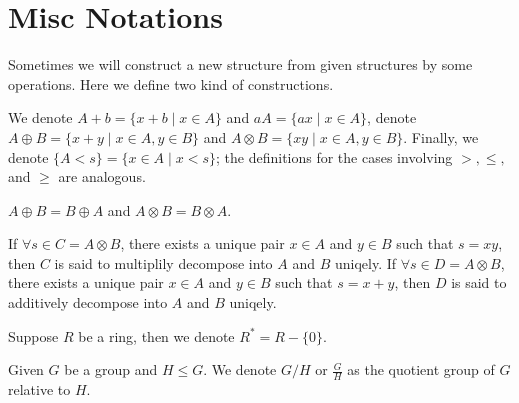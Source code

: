 \section{Misc Notations}\label{sec:misc-notations}
Sometimes we will construct a new structure from given structures by some operations. Here we define two kind of constructions.
\begin{definition}
    We denote $A + b = \{ x + b \mid x \in A \}$ and $aA = \{ ax \mid x \in A \}$,
    denote $A \oplus B = \{ x + y \mid x \in A, y \in B \}$ and $A \otimes B = \{ xy \mid x \in A, y \in B \}$.
    Finally, we denote $\{ A < s \} = \{ x \in A \mid x < s \}$; the definitions for the cases involving $>, \le,$ and $\ge$ are analogous.
\end{definition}
\begin{proposition}
    $A \oplus B = B \oplus A$ and $A \otimes B = B \otimes A$.
\end{proposition}
If $\forall s\in C = A \otimes B$, there exists a unique pair $x \in A$ and $y \in B$ such that $s = xy$, then $C$ is said to multiplily decompose into $A$ and $B$ uniqely. If $\forall s\in D = A \otimes B$, there exists a unique pair $x \in A$ and $y \in B$ such that $s = x + y$, then $D$ is said to additively decompose into $A$ and $B$ uniqely.

\begin{definition}
    Suppose $R$ be a ring, then we denote $R^{*} = R - \{0\}$.
\end{definition}
\begin{definition}
Given $G$ be a group and $H\le G$.
We denote $G/H$ or $\frac{G}{H}$ as the quotient group of $G$ relative to $H$.
\end{definition}

